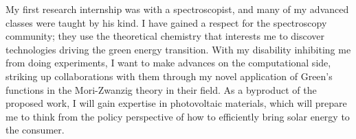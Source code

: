 My first research internship was with a spectroscopist, and many of my advanced classes were taught by his kind. I have gained a respect for the spectroscopy community; they use the theoretical chemistry that interests me to discover technologies driving the green energy transition. With my disability inhibiting me from doing experiments, I want to make advances on the computational side, striking up collaborations with them through my novel application of Green's functions in the Mori-Zwanzig theory in their field. As a byproduct of the proposed work, I will gain expertise in photovoltaic materials, which will prepare me to think from the policy perspective of how to efficiently bring solar energy to the consumer.